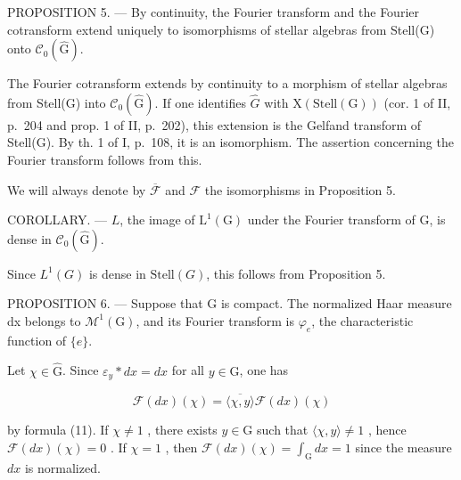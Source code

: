 PROPOSITION 5. --- By continuity, the Fourier transform and the Fourier cotransform extend uniquely to isomorphisms of stellar algebras from Stell(G) onto \(\mathcal{C}_{0}(\widehat{\mathrm{G}})\).

The Fourier cotransform extends by continuity to a morphism of stellar algebras from Stell(G) into \(\mathcal{C}_{0}(\widehat{\mathrm{G}})\). If one identifies \(\widehat{G}\) with \(\mathrm{X}(\mathrm{Stell}(\mathrm{G}))\) (cor. 1 of II, p.~204 and prop. 1 of II, p.~202), this extension is the Gelfand transform of Stell(G). By th. 1 of I, p.~108, it is an isomorphism. The assertion concerning the Fourier transform follows from this.

We will always denote by \(\overline{\mathcal{F}}\) and \(\mathcal{F}\) the isomorphisms in Proposition 5.

COROLLARY. --- \(L\), the image of \(\mathrm{L}^{1}(\mathrm{G})\) under the Fourier transform of G, is dense in \(\mathcal{C}_{0}(\widehat{\mathrm{G}})\).

Since \(L^{1}(G)\) is dense in \(\text{Stell}(G)\), this follows from Proposition 5.

PROPOSITION 6. — Suppose that G is compact. The normalized Haar measure dx belongs to \(\mathcal{M}^{1}(\mathrm{G})\), and its Fourier transform is \(\varphi_{e}\), the characteristic function of \(\{e\}\).

Let \(\chi \in \widehat{\mathrm{G}}\). Since \(\varepsilon_y * dx = dx\) for all \(y \in \mathrm{G}\), one has

\[
\mathcal {F} (d x) (\chi) = \overline {{\langle \chi , y \rangle}} \mathcal {F} (d x) (\chi)
\]

by formula (11). If \(\chi \neq 1\) , there exists \(y \in \mathrm{G}\) such that \(\langle \chi, y \rangle \neq 1\) , hence \(\mathcal{F}(dx)(\chi) = 0\) . If \(\chi = 1\) , then \(\mathcal{F}(dx)(\chi) = \int_{\mathrm{G}} dx = 1\) since the measure \(dx\) is normalized.

